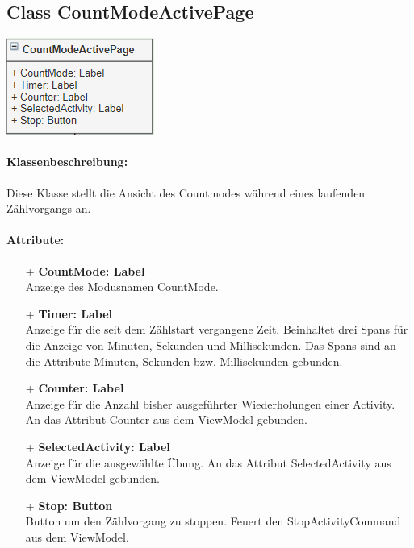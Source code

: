 \documentclass[a4paper,12pt]{article}
\begin{document}
\begin{minipage}[b]{0.7\textwidth}
	\subsection{Class CountModeActivePage}
\end{minipage}
\begin{minipage}[c]{0.3\textwidth}
	\includegraphics[width=\textwidth]{bilder/ViewKlassen/CountModeActivePage.png}
\end{minipage}
\paragraph{Klassenbeschreibung:}
Diese Klasse stellt die Ansicht des Countmodes während eines laufenden Zählvorgangs an.
\paragraph{Attribute:}
	\begin{itemize}
	\item[+] \textbf{CountMode: Label} \\ Anzeige des Modusnamen CountMode.
	\item[+] \textbf{Timer: Label} \\ Anzeige für die seit dem Zählstart vergangene Zeit. Beinhaltet drei Spans für die Anzeige von Minuten, Sekunden und Millisekunden. Das Spans sind an die Attribute Minuten, Sekunden bzw. Millisekunden gebunden.
	\item[+] \textbf{Counter: Label} \\ Anzeige für die Anzahl bisher ausgeführter Wiederholungen einer Activity. An das Attribut Counter aus dem ViewModel gebunden.
	\item[+] \textbf{SelectedActivity: Label} \\ Anzeige für die ausgewählte Übung. An das Attribut SelectedActivity aus dem ViewModel gebunden.
	\item[+] \textbf{Stop: Button} \\ Button um den Zählvorgang zu stoppen. Feuert den StopActivityCommand aus dem ViewModel.
	\end{itemize}
\end{document}
